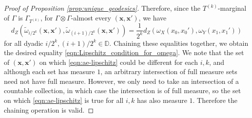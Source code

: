 \documentclass{article}
\theoremstyle{definition}
\begin{document}
\begin{proof}[Proof of Proposition \ref{prop:unique_geodesics}]

    Therefore, since the $T^{(k)}$-marginal of $\Gamma$ is $\Gamma_{T^{(k)}}$, for $\Gamma \otimes \Gamma$-almost every $(\mathbf{x}, \mathbf{x}')$, we have
    \begin{equation}
        \label{eqn:ae-lipschitz}
        d_Z(\tilde{\omega}_{i/2^k}(\mathbf{x},\mathbf{x}'), \tilde{\omega}_{(i+1)/2^k}(\mathbf{x},\mathbf{x}')) = \frac{1}{2^k}d_Z(\omega_X(x_0, x_0'), \omega_Y(x_1, x_1'))
    \end{equation}
    for all dyadic $i/2^k, (i+1)/2^k \in \mathbb{D}$. Chaining these equalities together, we obtain the desired equality \eqref{eqn:Lipschitz_condition_for_omega}. We note that the set of $(\mathbf{x},\mathbf{x}')$ on which \eqref{eqn:ae-lipschitz} could be different for each $i,k$, and although each set has measure $1$, an arbitrary intersection of full measure sets need not have full measure. However, we only need to take an intersection of a countable collection, in which case the intersection is of full measure, so the set on which \eqref{eqn:ae-lipschitz} is true for all $i,k$ has also measure $1$. Therefore the chaining operation is valid.


\end{proof}
\end{document}
